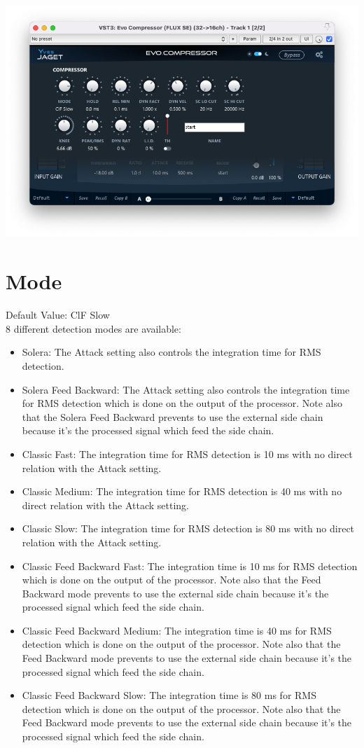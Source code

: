 \documentclass[
  letterpaper,
  DIV=11,
  numbers=noendperiod]{scrreport}
\providecommand{\tightlist}{%
  \setlength{\itemsep}{0pt}\setlength{\parskip}{0pt}}\usepackage{longtable,booktabs,array}
\begin{document}
\includegraphics{./include/evoComp_geek.png}

\hypertarget{mode-1}{%
\section{Mode}\label{mode-1}}

Default Value: ClF Slow\\
8 different detection modes are available:

\begin{itemize}
\tightlist
\item
  Solera: The Attack setting also controls the integration time for RMS
  detection.
\item
  Solera Feed Backward: The Attack setting also controls the integration
  time for RMS detection which is done on the output of the processor.
  Note also that the Solera Feed Backward prevents to use the external
  side chain because it's the processed signal which feed the side
  chain.
\item
  Classic Fast: The integration time for RMS detection is 10 ms with no
  direct relation with the Attack setting.
\item
  Classic Medium: The integration time for RMS detection is 40 ms with
  no direct relation with the Attack setting.
\item
  Classic Slow: The integration time for RMS detection is 80 ms with no
  direct relation with the Attack setting.
\item
  Classic Feed Backward Fast: The integration time is 10 ms for RMS
  detection which is done on the output of the processor. Note also that
  the Feed Backward mode prevents to use the external side chain because
  it's the processed signal which feed the side chain.
\item
  Classic Feed Backward Medium: The integration time is 40 ms for RMS
  detection which is done on the output of the processor. Note also that
  the Feed Backward mode prevents to use the external side chain because
  it's the processed signal which feed the side chain.
\item
  Classic Feed Backward Slow: The integration time is 80 ms for RMS
  detection which is done on the output of the processor. Note also that
  the Feed Backward mode prevents to use the external side chain because
  it's the processed signal which feed the side chain.
\end{itemize}
\end{document}
